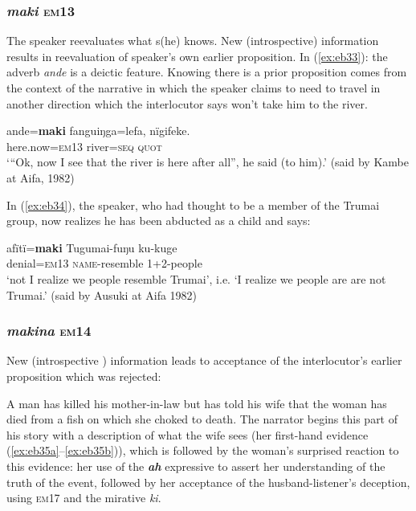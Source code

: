 \documentclass[output=paper]{langsci/langscibook}
\begin{document}
\subsubsection{\textit{maki} \textsc{em}13} 
The speaker reevaluates what s(he) knows.  New (introspective) information results in reevaluation of speaker’s own earlier proposition.  In (\ref{ex:eb33}): the adverb \textit{ande} is a deictic feature. Knowing there is a prior proposition comes from  the context of the narrative in which the speaker claims to need to travel in another direction which the interlocutor says won’t take him to the river.

\begin{exe}
	\ex \label{ex:eb33}
	\gll ande=\textbf{maki} fanguiŋga=lefa, nïgifeke.\\
	here.now=\textsc{em13} river=\textsc{seq} \textsc{quot}\\
	\trans `“Ok, now I see that the river is here after all”, he said (to him).’ (said by Kambe at Aifa, 1982)
\end{exe}

In (\ref{ex:eb34}), the speaker, who had thought to be a member of the Trumai group, now realizes he has been abducted as a child and says: 

\begin{exe}
	\ex \label{ex:eb34}
	\gll afïtï=\textbf{maki} Tugumai-fuŋu ku-kuge\\
	denial=\textsc{em13} \textsc{name}-resemble 1+2-people\\
	\trans ‘not I realize we people resemble Trumai’, i.e. ‘I realize we people are are not Trumai.’ (said by Ausuki at Aifa 1982)
\end{exe}

\subsubsection{\textit{makina} \textsc{em}14} New (introspective ) information leads to acceptance of the interlocutor’s earlier proposition which was rejected: 

A man has killed his mother-in-law but has told his wife that the woman has died from a fish on which she choked to death.  The narrator begins this part of his story with a description of what the wife sees (her first-hand evidence (\ref{ex:eb35a}--\ref{ex:eb35b})), which is followed by the woman’s surprised reaction to this evidence:  her  use of the \textbf{\textit{ah}} expressive to assert her understanding of the truth of the event, followed by her acceptance of the husband-listener’s deception,  using \textsc{em}17 and the mirative \textit{ki}.
\end{document}
